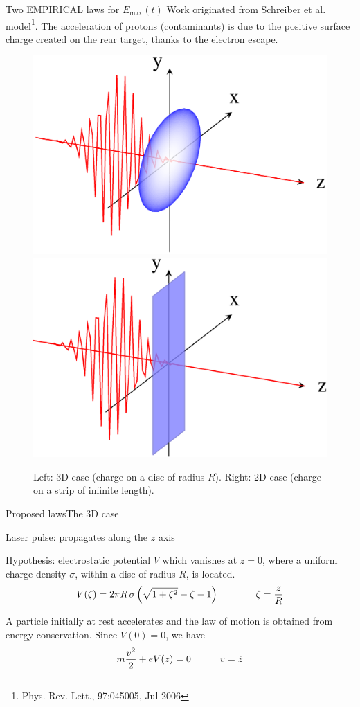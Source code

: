 \documentclass[final]{beamer}
\def\Emax{E_{\mathrm{max}}}
\begin{document}
\begin{frame}{Two EMPIRICAL laws for $\Emax(t)$}
Work originated from Schreiber et al. model\footnote{Phys. Rev. Lett., 97:045005, Jul 2006}.
The acceleration of protons (contaminants) is due to the positive surface charge created on the rear target, thanks to the electron escape.

\begin{figure}
\centering
\includegraphics[width=0.40 \textwidth]{figs/Fig_1a.png}
\hspace{1cm}
\includegraphics[width=0.40 \textwidth]{figs/Fig_1b.png} 
\caption{
  Left: 3D case (charge on a disc of radius $R$). Right: 2D case (charge on a strip of infinite length).
}
\end{figure} 
\end{frame}





\begin{frame}{Proposed laws}{The 3D case}

Laser pulse: propagates along the $z$ axis

Hypothesis: electrostatic potential $V$ which vanishes at $z=0$, where a uniform charge density $\sigma$, within a disc of radius $R$, is located.
%
\[ V(\zeta)= 2\pi R\,\sigma\,\Bigl( \sqrt{1+\zeta^2} -\zeta -1 \Bigr ) \qquad \qquad
\zeta={z\over R} \]
%

\vspace{5mm}
A particle initially at rest accelerates and the law of motion is obtained from energy conservation. Since $V(0)=0$, we have 
%
\[ m{v^2\over 2} +eV(z)=0 \qquad \quad v=\dot z \]
\end{frame}
\end{document}
